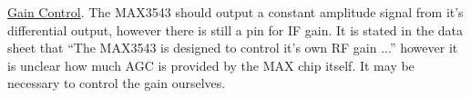\documentclass[a4paper, 12pt]{article}
\begin{document}
\underline{Gain Control}.  The MAX3543 should output a constant amplitude signal from it's differential output, however there is still a pin for IF gain.  It is stated in the data sheet that ``The MAX3543 is designed to control it's own RF gain ...'' however it is unclear how much AGC is provided by the MAX chip itself.  It may be necessary to control the gain ourselves.

\clearpage


\end{document}
